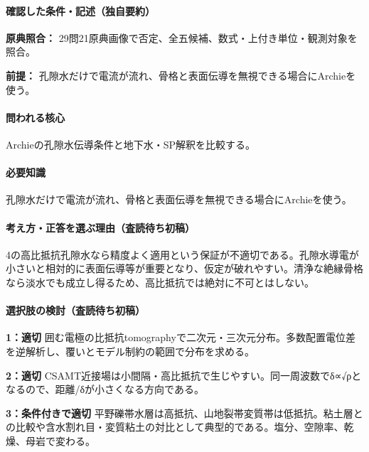 \paragraph{確認した条件・記述（独自要約）}\mbox{}\par

\noindent\textbf{原典照合：} 29問21原典画像で否定、全五候補、数式・上付き単位・観測対象を照合。\par

\noindent\textbf{前提：} 孔隙水だけで電流が流れ、骨格と表面伝導を無視できる場合にArchieを使う。\par

\paragraph{問われる核心} Archieの孔隙水伝導条件と地下水・SP解釈を比較する。

\paragraph{必要知識} 孔隙水だけで電流が流れ、骨格と表面伝導を無視できる場合にArchieを使う。

\paragraph{考え方・正答を選ぶ理由（査読待ち初稿）} 4の高比抵抗孔隙水なら精度よく適用という保証が不適切である。孔隙水導電が小さいと相対的に表面伝導等が重要となり、仮定が破れやすい。清浄な絶縁骨格なら淡水でも成立し得るため、高比抵抗では絶対に不可とはしない。

\paragraph{選択肢の検討（査読待ち初稿）}\mbox{}\par

\noindent\textbf{1：適切} 囲む電極の比抵抗tomographyで二次元・三次元分布。多数配置電位差を逆解析し、覆いとモデル制約の範囲で分布を求める。\par

\noindent\textbf{2：適切} CSAMT近接場は小間隔・高比抵抗で生じやすい。同一周波数でδ∝√ρとなるので、距離/δが小さくなる方向である。\par

\noindent\textbf{3：条件付きで適切} 平野礫帯水層は高抵抗、山地裂帯変質帯は低抵抗。粘土層との比較や含水割れ目・変質粘土の対比として典型的である。塩分、空隙率、乾燥、母岩で変わる。\par

